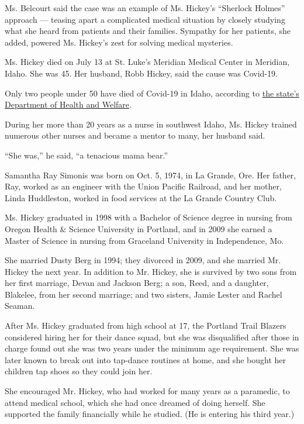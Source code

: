 Ms. Belcourt said the case was an example of Ms. Hickey's ``Sherlock
Holmes'' approach --- teasing apart a complicated medical situation by
closely studying what she heard from patients and their families.
Sympathy for her patients, she added, powered Ms. Hickey's zest for
solving medical mysteries.

Ms. Hickey died on July 13 at St. Luke's Meridian Medical Center in
Meridian, Idaho. She was 45. Her husband, Robb Hickey, said the cause
was Covid-19.

Only two people under 50 have died of Covid-19 in Idaho, according to
\href{https://public.tableau.com/profile/idaho.division.of.public.health\#!/vizhome/DPHIdahoCOVID-19Dashboard_V2/Story1}{the
state's Department of Health and Welfare}.

During her more than 20 years as a nurse in southwest Idaho, Ms. Hickey
trained numerous other nurses and became a mentor to many, her husband
said.

``She was,'' he said, ``a tenacious mama bear.''

Samantha Ray Simonis was born on Oct. 5, 1974, in La Grande, Ore. Her
father, Ray, worked as an engineer with the Union Pacific Railroad, and
her mother, Linda Huddleston, worked in food services at the La Grande
Country Club.

Ms. Hickey graduated in 1998 with a Bachelor of Science degree in
nursing from Oregon Health \& Science University in Portland, and in
2009 she earned a Master of Science in nursing from Graceland University
in Independence, Mo.

She married Dusty Berg in 1994; they divorced in 2009, and she married
Mr. Hickey the next year. In addition to Mr. Hickey, she is survived by
two sons from her first marriage, Devan and Jackson Berg; a son, Reed,
and a daughter, Blakelee, from her second marriage; and two sisters,
Jamie Lester and Rachel Seaman.

After Ms. Hickey graduated from high school at 17, the Portland Trail
Blazers considered hiring her for their dance squad, but she was
disqualified after those in charge found out she was two years under the
minimum age requirement. She was later known to break out into tap-dance
routines at home, and she bought her children tap shoes so they could
join her.

She encouraged Mr. Hickey, who had worked for many years as a paramedic,
to attend medical school, which she had once dreamed of doing herself.
She supported the family financially while he studied. (He is entering
his third year.)

